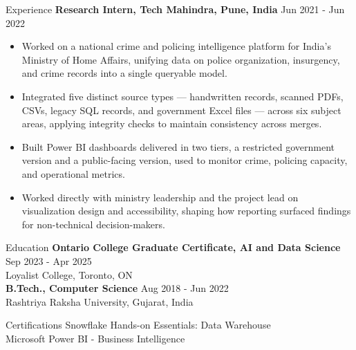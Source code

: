 \documentclass{resume}
\begin{document}
\begin{rSection}{Experience}
\textbf{Research Intern, Tech Mahindra, Pune, India} \hfill Jun 2021 - Jun 2022
\begin{itemize}
    \item Worked on a national crime and policing intelligence platform for India's Ministry of Home Affairs, unifying data on police organization, insurgency, and crime records into a single queryable model.
    \item Integrated five distinct source types --- handwritten records, scanned PDFs, CSVs, legacy SQL records, and government Excel files --- across six subject areas, applying integrity checks to maintain consistency across merges.
    \item Built Power BI dashboards delivered in two tiers, a restricted government version and a public-facing version, used to monitor crime, policing capacity, and operational metrics.
    \item Worked directly with ministry leadership and the project lead on visualization design and accessibility, shaping how reporting surfaced findings for non-technical decision-makers.
\end{itemize}

\end{rSection}


\begin{rSection}{Education}
\vspace{0.4em}
\textbf{Ontario College Graduate Certificate, AI and Data Science} \hfill Sep 2023 - Apr 2025 \\
Loyalist College, Toronto, ON \\
\textbf{B.Tech., Computer Science} \hfill Aug 2018 - Jun 2022 \\
Rashtriya Raksha University, Gujarat, India
\end{rSection}

\begin{rSection}{Certifications}
\vspace{0.4em}
Snowflake Hands-on Essentials: Data Warehouse \\
Microsoft Power BI - Business Intelligence
\end{rSection}
\end{document}
